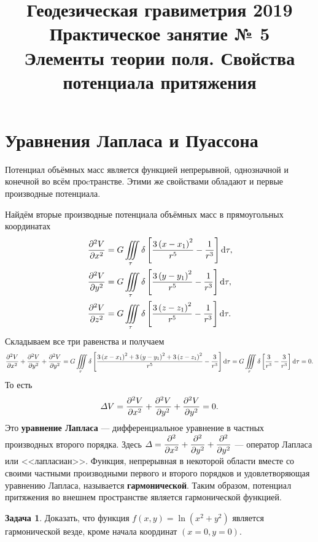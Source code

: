\documentclass[11pt, a4paper]{article}
\title{{\Large Геодезическая гравиметрия 2019}\\ 
    {\bf\Large Практическое занятие № 5} \\
{\Large Элементы теории поля. Свойства потенциала притяжения}}
\author{}
\date{\DTMusedate{lessondate}}
\theoremstyle{plain}
\theoremstyle{definition}
\newtheorem{problem}{Задача}[section]
\theoremstyle{remark}
\begin{document}
\maketitle

\section{Уравнения Лапласа и Пуассона}
Потенциал объёмных масс является функцией непрерывной, однозначной и конечной во всём проcтранстве.
Этими же свойствами обладают и первые производные потенциала.

Найдём вторые производные потенциала объёмных масс в прямоугольных
координатах
\begin{align*}
    &\dpd[2]{V}{x} = G\iiint\limits_{\tau} \delta \left[ \dfrac{3 \left( x - x_1 \right)^2}{r^5} -
    \dfrac{1}{r^3} \right]\dif\tau, \\
    &\dpd[2]{V}{y} = G\iiint\limits_{\tau} \delta \left[ \dfrac{3 \left( y - y_1 \right)^2}{r^5} -
    \dfrac{1}{r^3} \right]\dif\tau, \\
    &\dpd[2]{V}{z} = G\iiint\limits_{\tau} \delta \left[ \dfrac{3 \left( z - z_1 \right)^2}{r^5} -
    \dfrac{1}{r^3} \right]\dif\tau.
\end{align*}
Складываем все три равенства и получаем
\begin{equation*}
    \dpd[2]{V}{x} + \dpd[2]{V}{y} + \dpd[2]{V}{y} = 
    G\iiint\limits_{\tau} \delta \left[ \dfrac{3 \left( x - x_1 \right)^2 +
        3 \left( y - y_1 \right)^2 +3 \left( z - z_1 \right)^2}{r^5} - \dfrac{3}{r^3} 
    \right]\dif\tau =
    G\iiint\limits_{\tau} \delta \left[ \dfrac{3}{r^3} - \dfrac{3}{r^3} \right]\dif\tau = 0.
\end{equation*}
То есть
\begin{equation*}
    \Delta V = \dpd[2]{V}{x} + \dpd[2]{V}{y} + \dpd[2]{V}{y} = 0.
\end{equation*}
Это \textbf{уравнение Лапласа} --- дифференциальное уравнение в частных производных второго порядка. Здесь
$\Delta = \dpd[2]{}{x} + \dpd[2]{}{y} + \dpd[2]{}{y}$ --- оператор Лапласа или <<лапласиан>>.
Функция, непрерывная в некоторой области вместе со своими частными производными первого и второго
порядков и удовлетворяющая уравнению Лапласа, называется \textbf{гармонической}. Таким образом,
потенциал притяжения во внешнем пространстве является гармонической функцией.

\begin{problem}
Доказать, что функция $f (x, y) = \ln (x^2 + y^2)$ является гармонической везде, кроме начала координат $(x = 0, y = 0)$.
\end{problem}
\end{document}
